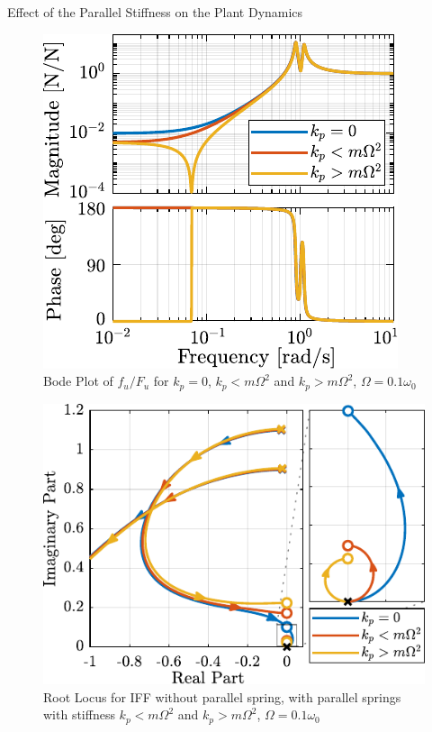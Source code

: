 \documentclass[t, minted]{clean-beamer}
\begin{document}
\begin{frame}[label={sec:org223db59}]{Effect of the Parallel Stiffness on the Plant Dynamics}
\begin{minipage}[b]{0.42\linewidth}
\begin{figure}[htbp]
\centering
\includegraphics[width=\linewidth]{figs/plant_iff_kp.pdf}
\caption{Bode Plot of \(f_u/F_u\) for \(k_p = 0\), \(k_p < m \Omega^2\) and \(k_p > m \Omega^2\), \(\Omega = 0.1 \omega_0\)}
\end{figure}
\end{minipage}
\hfill
\begin{minipage}[b]{0.55\linewidth}
\begin{figure}[htbp]
\centering
\includegraphics[width=\linewidth]{figs/root_locus_iff_kp.pdf}
\caption{Root Locus for IFF without parallel spring, with parallel springs with stiffness \(k_p < m \Omega^2\) and \(k_p > m \Omega^2\), \(\Omega = 0.1 \omega_0\)}
\end{figure}
\end{minipage}


\end{frame}
\end{document}

